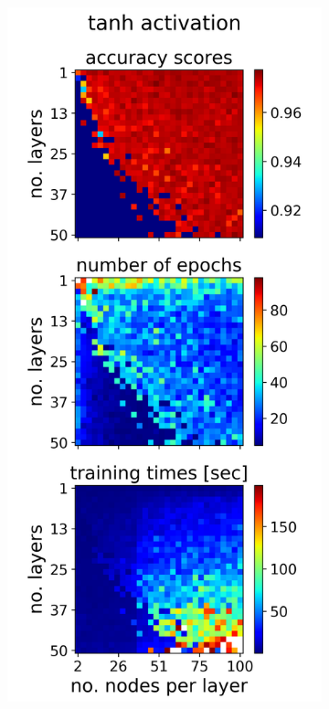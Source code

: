 \documentclass[nofootinbib,reprint,english]{revtex4-1}
\begin{document}
\begin{figure}[h!]
\begin{subfigure}{0.32\textwidth}
	\end{subfigure}
	~
	\begin{subfigure}{0.32\textwidth}
	\centering
	\includegraphics[scale=0.38]{../results/NN/img/gridsearch1_tanh1.png}

\end{subfigure}
\end{figure}
\end{document}
